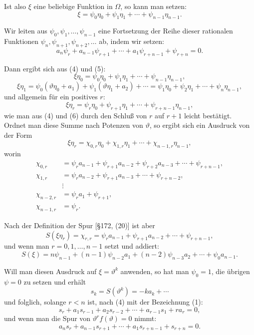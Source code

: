 \documentclass[12pt,a4paper]{article}
\theoremstyle{definition}
\begin{document}
Ist also $\xi$ eine beliebige Funktion in $\Omega$, so kann man setzen:
\begin{equation}
\xi = \psi_0\eta_0 + \psi_1\eta_1 + \cdots + \psi_{n-1}\eta_{n-1}.
\end{equation}

Wir leiten aus $\psi_0, \psi_1, \ldots, \psi_{n-1}$ eine Fortsetzung der Reihe dieser rationalen Funktionen $\psi_n, \psi_{n+1}, \psi_{n+2}, \ldots$ ab, indem wir setzen:
\begin{equation}
a_n\psi_r + a_{n-1}\psi_{r+1} + \cdots + a_1\psi_{r+n-1} + \psi_{r+n} = 0.
\end{equation}

Dann ergibt sich aus (4) und (5):
\[\xi\eta_0 = \psi_0\eta_0 + \psi_1\eta_1 + \cdots + \psi_{n-1}\eta_{n-1},\]
\[\xi\eta_1 = \psi_0(\vartheta\eta_0 + a_1) + \psi_1(\vartheta\eta_1 + a_2) + \cdots = \psi_1\eta_0 + \psi_2\eta_1 + \cdots + \psi_n\eta_{n-1},\]
und allgemein für ein positives $r$:
\begin{equation}
\xi\eta_r = \psi_r\eta_0 + \psi_{r+1}\eta_1 + \cdots + \psi_{r+n-1}\eta_{n-1},
\end{equation}
wie man aus (4) und (6) durch den Schluß von $r$ auf $r+1$ leicht bestätigt. Ordnet man diese Summe nach Potenzen von $\vartheta$, so ergibt sich ein Ausdruck von der Form
\[\xi\eta_r = \chi_{0,r}\eta_0 + \chi_{1,r}\eta_1 + \cdots + \chi_{n-1,r}\eta_{n-1},\]
worin
\begin{align*}
\chi_{0,r} &= \psi_r a_{n-1} + \psi_{r+1}a_{n-2} + \psi_{r+2}a_{n-3} + \cdots + \psi_{r+n-1}, \\
\chi_{1,r} &= \psi_r a_{n-2} + \psi_{r+1}a_{n-3} + \cdots + \psi_{r+n-2}, \\
&\vdots \\
\chi_{n-2,r} &= \psi_r a_1 + \psi_{r+1}, \\
\chi_{n-1,r} &= \psi_r.
\end{align*}

Nach der Definition der Spur [\S 172, (20)] ist aber
\[S(\xi\eta_r) = \chi_{r,r} = \psi_r a_{n-1} + \psi_{r+1}a_{n-2} + \cdots + \psi_{r+n-1},\]
und wenn man $r = 0, 1, \ldots, n-1$ setzt und addiert:
\begin{equation}
S(\xi) = n\psi_{n-1} + (n-1)\psi_{n-2}a_1 + (n-2)\psi_{n-3}a_2 + \cdots + \psi_0a_{n-1}.
\end{equation}

Will man diesen Ausdruck auf $\xi = \vartheta^k$ anwenden, so hat man $\psi_0 = 1$, die übrigen $\psi = 0$ zu setzen und erhält
\[s_k = S(\vartheta^k) = -ka_k + \cdots\]
und folglich, solange $r < n$ ist, nach (4) mit der Bezeichnung (1):
\begin{equation}
s_r + a_1s_{r-1} + a_2s_{r-2} + \cdots + a_{r-1}s_1 + ra_r = 0,
\end{equation}
und wenn man die Spur von $\vartheta^r f(\vartheta) = 0$ nimmt:
\begin{equation}
a_ns_r + a_{n-1}s_{r+1} + \cdots + a_1s_{r+n-1} + s_{r+n} = 0.
\end{equation}
\end{document}
